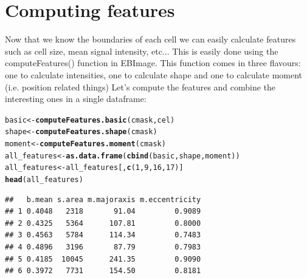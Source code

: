 \documentclass{article}\usepackage[]{graphicx}\usepackage[]{color}
\makeatletter
\newcommand{\hlnum}[1]{\textcolor[rgb]{0.686,0.059,0.569}{#1}}%
\newcommand{\hlstd}[1]{\textcolor[rgb]{0.345,0.345,0.345}{#1}}%
\newcommand{\hlkwb}[1]{\textcolor[rgb]{0.69,0.353,0.396}{#1}}%
\newcommand{\hlkwd}[1]{\textcolor[rgb]{0.737,0.353,0.396}{\textbf{#1}}}%
\newenvironment{kframe}{%
 \def\at@end@of@kframe{}%
 \ifinner\ifhmode%
  \def\at@end@of@kframe{\end{minipage}}%
  \begin{minipage}{\columnwidth}%
 \fi\fi%
 \def\FrameCommand##1{\hskip\@totalleftmargin \hskip-\fboxsep
 \colorbox{shadecolor}{##1}\hskip-\fboxsep
     \hskip-\linewidth \hskip-\@totalleftmargin \hskip\columnwidth}%
 \MakeFramed {\advance\hsize-\width
   \@totalleftmargin\z@ \linewidth\hsize
   \@setminipage}}%
 {\par\unskip\endMakeFramed%
 \at@end@of@kframe}
\newenvironment{knitrout}{}{} %
\makeatother
\begin{document}
\section{Computing features}
Now that we know the boundaries of each cell we can easily calculate features such as cell size, mean signal intensity, etc...
This is easily done using the computeFeatures() function in EBImage. This function comes in three flavours: one to calculate intensities, one to calculate shape and one to calculate moment (i.e. position related things)
Let's compute the features and combine the interesting ones in a single dataframe:
\begin{knitrout}
\color{fgcolor}\begin{kframe}
\begin{alltt}
\hlstd{basic} \hlkwb{<-} \hlkwd{computeFeatures.basic}\hlstd{(cmask, cel)}
\hlstd{shape} \hlkwb{<-} \hlkwd{computeFeatures.shape}\hlstd{(cmask)}
\hlstd{moment} \hlkwb{<-} \hlkwd{computeFeatures.moment}\hlstd{(cmask)}
\hlstd{all_features} \hlkwb{<-} \hlkwd{as.data.frame}\hlstd{(}\hlkwd{cbind}\hlstd{(basic, shape, moment))}
\hlstd{all_features} \hlkwb{<-} \hlstd{all_features[,} \hlkwd{c}\hlstd{(}\hlnum{1}\hlstd{,} \hlnum{9}\hlstd{,} \hlnum{16}\hlstd{,} \hlnum{17}\hlstd{)]}
\hlkwd{head}\hlstd{(all_features)}
\end{alltt}
\begin{verbatim}
##   b.mean s.area m.majoraxis m.eccentricity
## 1 0.4048   2318       91.04         0.9089
## 2 0.4325   5364      107.81         0.8000
## 3 0.4563   5784      114.34         0.7483
## 4 0.4896   3196       87.79         0.7983
## 5 0.4185  10045      241.35         0.9090
## 6 0.3972   7731      154.50         0.8181
\end{verbatim}
\end{kframe}
\end{knitrout}
\end{document}
